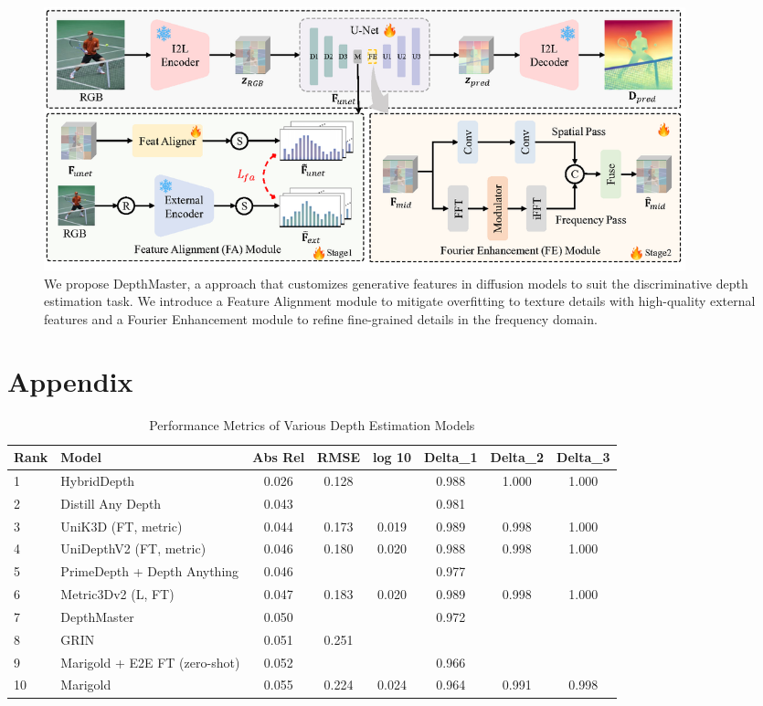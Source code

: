 \documentclass{article}
\begin{document}
\begin{figure}[h!]
  \centering
  \includegraphics[width=0.9\textwidth]{images/framework_v6.png}
  \caption{We propose DepthMaster, a approach that customizes generative features in diffusion models to suit the discriminative depth estimation task. We introduce a Feature Alignment module to mitigate overfitting to texture details with high-quality external features and a Fourier Enhancement module to refine fine-grained details in the frequency domain.}
\end{figure}


\newpage

\section{Appendix}

\begin{table}[h!]
    \centering
    \small
    \label{tab:depth_models}
    \begin{tabular}{l l c c c c c c}
        \toprule
        Rank & Model & Abs Rel & RMSE & log 10 & Delta_1 & Delta_2 & Delta_3 \\
        \midrule
        1 & HybridDepth & 0.026 & 0.128 & & 0.988 & 1.000 & 1.000 \\
        2 & Distill Any Depth & 0.043 & & & 0.981 & & \\
        3 & UniK3D (FT, metric) & 0.044 & 0.173 & 0.019 & 0.989 & 0.998 & 1.000 \\
        4 & UniDepthV2 (FT, metric) & 0.046 & 0.180 & 0.020 & 0.988 & 0.998 & 1.000 \\
        5 & PrimeDepth + Depth Anything & 0.046 & & & 0.977 & & \\
        6 & Metric3Dv2 (L, FT) & 0.047 & 0.183 & 0.020 & 0.989 & 0.998 & 1.000 \\
        7 & DepthMaster & 0.050 & & & 0.972 & & \\
        8 & GRIN & 0.051 & 0.251 & & & & \\
        9 & Marigold + E2E FT (zero-shot) & 0.052 & & & 0.966 & & \\
        10 & Marigold & 0.055 & 0.224 & 0.024 & 0.964 & 0.991 & 0.998 \\
        \bottomrule
    \end{tabular}
    \caption{Performance Metrics of Various Depth Estimation Models}
\end{table}
\end{document}
